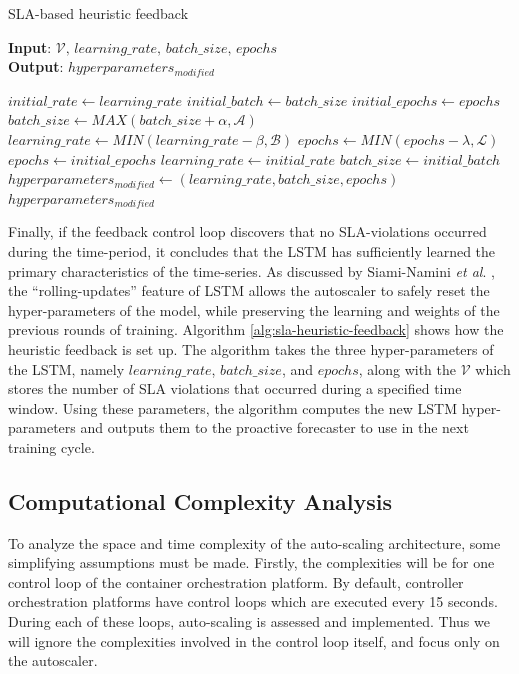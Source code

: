 \begin{algorithm}
    \caption{SLA-based heuristic feedback}
    \label{alg:sla-heuristic-feedback}
    \textbf{Input}: $\mathcal{V},\,learning\_rate,\,batch\_size,\,epochs$\\
    \textbf{Output}: $hyperparameters_{modified}$
    \begin{algorithmic}
        \State $initial\_rate \gets learning\_rate$
        \State $initial\_batch \gets batch\_size$
        \State $initial\_epochs \gets epochs$
            \State $batch\_size \gets MAX(batch\_size + \alpha, \mathcal{A})$
            \State $learning\_rate \gets MIN(learning\_rate - \beta, \mathcal{B})$
            \State $epochs \gets MIN(epochs - \lambda, \mathcal{L})$
        \Else
            \State $epochs \gets initial\_epochs$
            \State $learning\_rate \gets initial\_rate$
            \State $batch\_size \gets initial\_batch$
        \EndIf
        \State $hyperparameters_{modified} \gets (learning\_rate, batch\_size, epochs)$
        \State \Return $hyperparameters_{modified}$
    \end{algorithmic}
\end{algorithm}

Finally, if the feedback control loop discovers that no SLA-violations occurred during the time-period, it concludes that the LSTM has sufficiently learned the primary characteristics of the time-series. As discussed by Siami-Namini \textit{et al}. \cite{siami2018comparison}, the ``rolling-updates'' feature of LSTM allows the autoscaler to safely reset the hyper-parameters of the model, while preserving the learning and weights of the previous rounds of training. Algorithm \ref{alg:sla-heuristic-feedback} shows how the heuristic feedback is set up. The algorithm takes the three hyper-parameters of the LSTM, namely $learning\_rate$, $batch\_size$, and $epochs$, along with the $\mathcal{V}$ which stores the number of SLA violations that occurred during a specified time window. Using these parameters, the algorithm computes the new LSTM hyper-parameters and outputs them to the proactive forecaster to use in the next training cycle.\par

\subsection{Computational Complexity Analysis}
\label{subsec:ch4-space-time-comp}

To analyze the space and time complexity of the auto-scaling architecture, some simplifying assumptions must be made. Firstly, the complexities will be for one control loop of the container orchestration platform. By default, controller orchestration platforms have control loops which are executed every 15 seconds. During each of these loops, auto-scaling is assessed and implemented. Thus we will ignore the complexities involved in the control loop itself, and focus only on the autoscaler.\par

